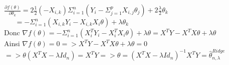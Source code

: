 \documentclass[11pt,a4paper,fleqn]{article}
\begin{document}
$\frac{\partial f(\theta)}{\partial \theta_k}=2\frac{1}{2} (-X_{i,k}) \Sigma_{i=1}^n (Y_i-\Sigma_{j=1}^pX_{i,j}\theta_j)+2\frac{\lambda}{2} \theta_k$ \\

$~~~~~~~=-\Sigma_{i=1}^n(X_{i,k}Y_i-X_{i,k}X_i\theta)+\lambda \theta_k$ \\

Donc $\nabla f(\theta)=-\Sigma_{i=1}^n(X_i^TY_i-X_i^TX_i\theta)+\lambda \theta=X^TY-X^TX\theta + \lambda \theta$ \\

Ainsi $\nabla f(\theta)=0 => X^TY-X^TX\theta + \lambda \theta=0$ \\
$=> \theta(X^TX - \lambda Id_n) = X^TY => \theta = (X^TX - \lambda Id_n)^{-1} X^TY = \hat{\theta}_{n,\lambda}^{Ridge} $
\end{document}
